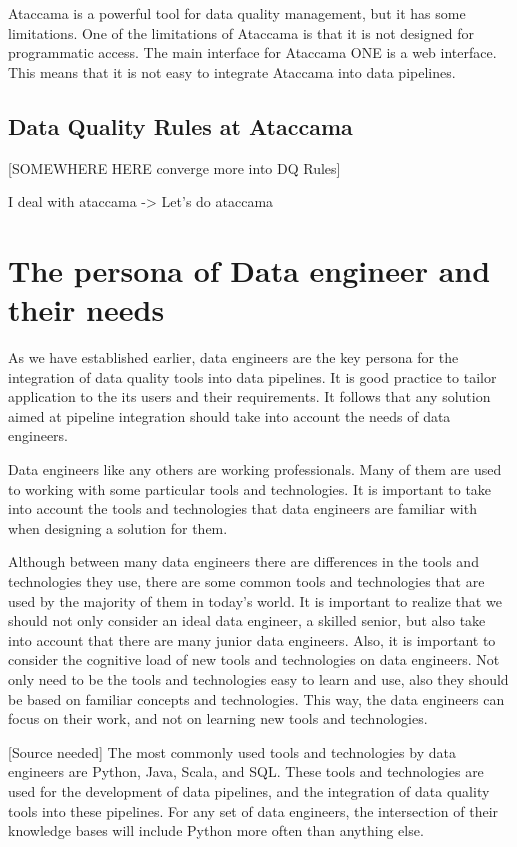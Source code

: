 Ataccama is a powerful tool for data quality management, but it has some limitations. One of the limitations of Ataccama is that it is not designed for programmatic access. The main interface for Ataccama ONE is a web interface. This means that it is not easy to integrate Ataccama into data pipelines. 

\subsection{Data Quality Rules at Ataccama}

[SOMEWHERE HERE converge more into DQ Rules]

I deal with ataccama -> Let’s do ataccama

\section{The persona of Data engineer and their needs}

As we have established earlier, data engineers are the key persona for the integration of data quality tools into data pipelines. It is good practice to tailor application to the its users and their requirements. It follows that any solution aimed at pipeline integration should take into account the needs of data engineers.

Data engineers like any others are working professionals. Many of them are used to working with some particular tools and technologies. It is important to take into account the tools and technologies that data engineers are familiar with when designing a solution for them.

Although between many data engineers there are differences in the tools and technologies they use, there are some common tools and technologies that are used by the majority of them in today's world. It is important to realize that we should not only consider an ideal data engineer, a skilled senior, but also take into account that there are many junior data engineers. Also, it is important to consider the cognitive load of new tools and technologies on data engineers. Not only need to be the tools and technologies easy to learn and use, also they should be based on familiar concepts and technologies. This way, the data engineers can focus on their work, and not on learning new tools and technologies. 

[Source needed] The most commonly used tools and technologies by data engineers are Python, Java, Scala, and SQL. These tools and technologies are used for the development of data pipelines, and the integration of data quality tools into these pipelines. For any set of data engineers, the intersection of their knowledge bases will include Python more often than anything else.

